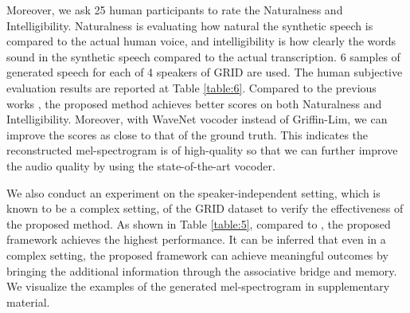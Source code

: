 \documentclass[10pt,twocolumn,letterpaper]{article}
\begin{document}
\begin{table}[]
	\renewcommand{\arraystretch}{1.2}
	\renewcommand{\tabcolsep}{4mm}
\centering
{}
    \vspace{0.1cm}
    \caption{Performance of speech reconstruction comparison with visual modal inputs in a speaker-dependent setting on GRID.}
    \vspace{-0.6cm}
	\label{table:4}
\end{table}

Moreover, we ask 25 human participants to rate the Naturalness and Intelligibility. Naturalness is evaluating how natural the synthetic speech is compared to the actual human voice, and intelligibility is how clearly the words sound in the synthetic speech compared to the actual transcription. 6 samples of generated speech for each of 4 speakers of GRID are used. The human subjective evaluation results are reported at Table \ref{table:6}. Compared to the previous works \cite{ephrat2017vid2speech, l2w}, the proposed method achieves better scores on both Naturalness and Intelligibility. Moreover, with WaveNet \cite{wavenet} vocoder instead of Griffin-Lim, we can improve the scores as close to that of the ground truth. This indicates the reconstructed mel-spectrogram is of high-quality so that we can further improve the audio quality by using the state-of-the-art vocoder.

We also conduct an experiment on the speaker-independent setting, which is known to be a complex setting, of the GRID dataset to verify the effectiveness of the proposed method. As shown in Table \ref{table:5}, compared to \cite{ganbased, l2w}, the proposed framework achieves the highest performance. It can be inferred that even in a complex setting, the proposed framework can achieve meaningful outcomes by bringing the additional information through the associative bridge and memory. We visualize the examples of the generated mel-spectrogram in supplementary material.
\end{document}
